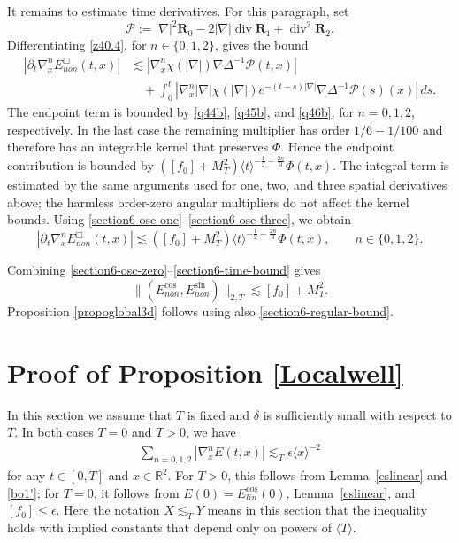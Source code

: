 \documentclass[reqno,11pt]{amsart}
\numberwithin{equation}{section}
\def\R{{\mathbb R}}
\def\R{{\bf R}}
\def\R{\mathbb{R}}
\begin{document}
It remains to estimate time derivatives. For this paragraph, set
\[
\mathcal P
:=|\nabla|^2\mathbf R_0-2|\nabla|\operatorname{div}\mathbf R_1
+\operatorname{div}^2\mathbf R_2.
\]
Differentiating \eqref{z40.4}, for $n\in\{0,1,2\}$, gives the bound
\begin{align*}
|\partial_t\nabla_x^nE^\Box_{non}(t,x)|
&\lesssim
\left|\nabla_x^n\chi(|\nabla|)\nabla\Delta^{-1}
\mathcal P(t,x)\right|\\
&\quad+\int_0^t\left|\nabla_x^n|\nabla|\chi(|\nabla|)
e^{-(t-s)|\nabla|}\nabla\Delta^{-1}\mathcal P(s)(x)\right|\,ds.
\end{align*}
The endpoint term is bounded by \eqref{q44b}, \eqref{q45b}, and
\eqref{q46b}, for $n=0,1,2$, respectively. In the last case the remaining
multiplier has order $1/6-1/100$ and therefore has an integrable kernel
that preserves $\Phi$. Hence the endpoint contribution is bounded by $([f_0]+M_T^2)\langle t\rangle^{-\frac12-\frac{2n}{3}}\Phi(t,x)$. 
The integral term is estimated by the same arguments used for one, two,
and three spatial derivatives above; the harmless order-zero angular
multipliers do not affect the kernel bounds. Using
\eqref{section6-osc-one}--\eqref{section6-osc-three}, we obtain
\begin{equation}\label{section6-time-bound}
|\partial_t\nabla_x^nE^\Box_{non}(t,x)|
\lesssim([f_0]+M_T^2)
\langle t\rangle^{-\frac12-\frac{2n}{3}}\Phi(t,x),
\qquad n\in\{0,1,2\}.
\end{equation}

Combining \eqref{section6-osc-zero}--\eqref{section6-time-bound} gives
\begin{equation}\label{section6-osc-bound}
\|(E^{\cos}_{non},E^{\sin}_{non})\|_{2,T}
\lesssim [f_0]+M_T^2.
\end{equation}
Proposition \ref{propoglobal3d} follows using also \eqref{section6-regular-bound}.

	\section{Proof of Proposition \ref{Localwell}} 

	In this section we assume that $T$ is fixed and $\delta$ is sufficiently small with respect to $T$. In both cases $T=0$ and $T>0$, we have
	\begin{align}\label{a35}
		\sum_{n=0,1,2}|\nabla_x^{n} E(t,x)|\lesssim_T\epsilon \langle x\rangle^{-2}
	\end{align}
	for any $t\in [0,T]$ and $x\in\R^2$. For $T>0$, this follows from
	Lemma~\ref{eslinear} and \eqref{bo1'}; for $T=0$, it follows from
	$E(0)=E_{lin}^{\cos}(0)$, Lemma~\ref{eslinear}, and $[f_0]\leq\epsilon$.
	Here the notation $X\lesssim_T Y$ means in this section that the inequality holds with implied constants that depend only on powers of $\langle T\rangle$. 
	
\end{document}
